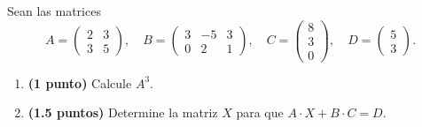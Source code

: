 
Sean las matrices
\[
A=\begin{pmatrix}2&3\\3&5\end{pmatrix},\quad
B=\begin{pmatrix}3&-5&3\\0&2&1\end{pmatrix},\quad
C=\begin{pmatrix}8\\3\\0\end{pmatrix},\quad
D=\begin{pmatrix}5\\3\end{pmatrix}.
\]
\begin{enumerate}[label=\alph*)]
\item \textbf{(1 punto)} Calcule $A^3$.
\item \textbf{(1.5 puntos)} Determine la matriz $X$ para que $A\cdot X+B\cdot C=D$.
\end{enumerate}
